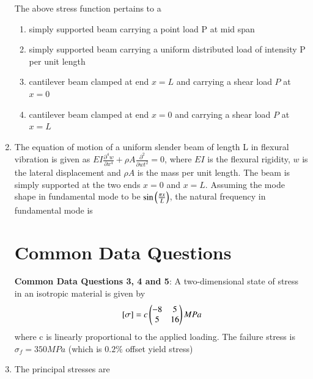 \documentclass[journal,12pt,onecolumn]{IEEEtran}
\theoremstyle{remark}
\begin{document}
\begin{enumerate}
      The above stress function pertains to a 
      \begin{enumerate}
      \item simply supported beam carrying a point load P at mid span 
      \item simply supported beam carrying a uniform distributed load of intensity P per unit length 
      \item cantilever beam clamped at end $x = L$ and carrying a shear load $P$ at $x = 0$
      \item cantilever beam clamped at end $x = 0$ and carrying a shear load $P$ at $x = L$
      \end{enumerate}
\item The equation of motion of a uniform slender beam of length L in flexural vibration is given as $EI
\frac{{\partial}^4 w}{\partial {x}^{4}} + \rho A \frac{{\partial}^{2}}{\partial w {t}^{2}}=0$, where $EI$ is the flexural rigidity, $w$ is the lateral displacement and $\rho A$ is the mass per unit length. The beam is simply supported at the two ends $x =0$ and $x=L$. Assuming the mode shape in fundamental mode to be $\sin\left(\frac{{\pi x}}{L}\right)$, the natural frequency in fundamental mode is 
\begin{enumerate}
\end{enumerate}

\section{Common Data Questions}
\textbf{Common Data Questions 3, 4 and 5}: A two-dimensional state of stress in an isotropic material is given by 
\begin{align}
   {}\left[\sigma\right] = c \begin{pmatrix}-8 & 5 \\ 5 & 16\end{pmatrix} MPa
\end{align} 
where c is linearly proportional to the applied loading. The failure stress is $\sigma_{f}=350MPa$ (which is $0.2\%$ offset yield stress)
\item The principal stresses are 
\begin{enumerate}
\end{enumerate}


\end{enumerate}
\end{document}
